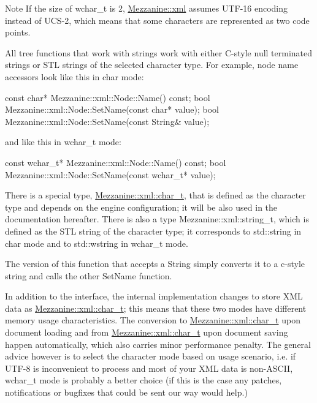 \begin{DoxyNote}{Note}
If the size of wchar\_\-t is 2, \hyperlink{namespaceMezzanine_1_1xml}{Mezzanine::xml} assumes UTF-\/16 encoding instead of UCS-\/2, which means that some characters are represented as two code points.
\end{DoxyNote}
All tree functions that work with strings work with either C-\/style null terminated strings or STL strings of the selected character type. For example, node name accessors look like this in char mode: 
\begin{DoxyCode}
 const char* Mezzanine::xml::Node::Name() const;
 bool Mezzanine::xml::Node::SetName(const char* value);
 bool Mezzanine::xml::Node::SetName(const String& value);
\end{DoxyCode}
 and like this in wchar\_\-t mode: 
\begin{DoxyCode}
 const wchar_t* Mezzanine::xml::Node::Name() const;
 bool Mezzanine::xml::Node::SetName(const wchar_t* value);
\end{DoxyCode}
 There is a special type, \hyperlink{namespaceMezzanine_1_1xml_a29b8a47c179e9895c4e9e66c45d1dbbc}{Mezzanine::xml::char\_\-t}, that is defined as the character type and depends on the engine configuration; it will be also used in the documentation hereafter. There is also a type Mezzanine::xml::string\_\-t, which is defined as the STL string of the character type; it corresponds to std::string in char mode and to std::wstring in wchar\_\-t mode. \par
 \par
 The version of this function that accepts a String simply converts it to a c-\/style string and calls the other SetName function. \par
 \par
 In addition to the interface, the internal implementation changes to store XML data as \hyperlink{namespaceMezzanine_1_1xml_a29b8a47c179e9895c4e9e66c45d1dbbc}{Mezzanine::xml::char\_\-t}; this means that these two modes have different memory usage characteristics. The conversion to \hyperlink{namespaceMezzanine_1_1xml_a29b8a47c179e9895c4e9e66c45d1dbbc}{Mezzanine::xml::char\_\-t} upon document loading and from \hyperlink{namespaceMezzanine_1_1xml_a29b8a47c179e9895c4e9e66c45d1dbbc}{Mezzanine::xml::char\_\-t} upon document saving happen automatically, which also carries minor performance penalty. The general advice however is to select the character mode based on usage scenario, i.e. if UTF-\/8 is inconvenient to process and most of your XML data is non-\/ASCII, wchar\_\-t mode is probably a better choice (if this is the case any patches, notifications or bugfixes that could be sent our way would help.) \par
